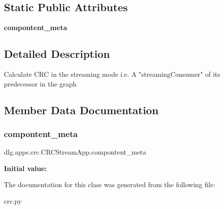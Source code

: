 \subsection*{Static Public Attributes}
\begin{DoxyCompactItemize}
\item 
{\bfseries compontent\+\_\+meta}
\end{DoxyCompactItemize}


\subsection{Detailed Description}
\begin{DoxyVerb}Calculate CRC in the streaming mode
i.e. A "streamingConsumer" of its predecessor in the graph
\end{DoxyVerb}
 

\subsection{Member Data Documentation}
\mbox{\label{classdlg_1_1apps_1_1crc_1_1_c_r_c_stream_app_af3e0e17ff72f9906d5c3104f5319fe9b}} 
\subsubsection{\texorpdfstring{compontent\_meta}{compontent\_meta}}
{\footnotesize\ttfamily dlg.\+apps.\+crc.\+C\+R\+C\+Stream\+App.\+compontent\+\_\+meta\hspace{0.3cm}{\ttfamily [static]}}

{\bfseries Initial value\+:}
\begin{DoxyCode}{0}

\end{DoxyCode}


The documentation for this class was generated from the following file\+:\begin{DoxyCompactItemize}
\item 
crc.\+py\end{DoxyCompactItemize}
